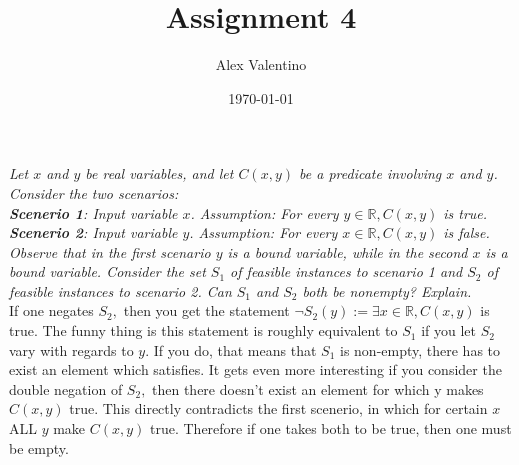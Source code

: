\documentclass[12pt, letterpaper]{article}
\date{\today}
\author{Alex Valentino}
\title{Assignment 4}
\newcommand{\R}{\mathbb{R}}
\begin{document}
	\textit{Let $x$ and $y$ be real variables, and let $C(x, y)$ be a predicate involving $x$ and $y$.
Consider the two scenarios:\\
	\textbf{Scenerio 1}: Input variable $x$.  Assumption: For every $y \in \R, C(x,y)$ is true.\\
	\textbf{Scenerio 2}: Input variable $y$.  Assumption: For every $x \in \R, C(x,y)$ is false.\\
	Observe that in the first scenario $y$ is a bound variable, while in the second $x$ is a bound
variable. Consider the set $S_1$ of feasible instances to scenario 1 and $S_2$ of feasible instances
to scenario 2.
Can $S_1$ and $S_2$ both be nonempty? Explain.}  \\
	If one negates $S_2, $ then you get the statement $\neg S_2(y) := \exists x \in \R, C(x,y)$ is true.  The funny thing is this statement is roughly equivalent to $S_1$ if you let $S_2$ vary with regards to $y$.  If you do, that means that $S_1$ is non-empty, there has to exist an element which satisfies.  It gets even more interesting if you consider the double negation of $S_2,$ then there doesn't exist an element for which y makes $C(x,y)$ true.  This directly contradicts the first scenerio, in which for certain $x$ ALL $y$ make $C(x,y)$ true.  Therefore if one takes both to be true, then one must be empty.
	
\end{document}
